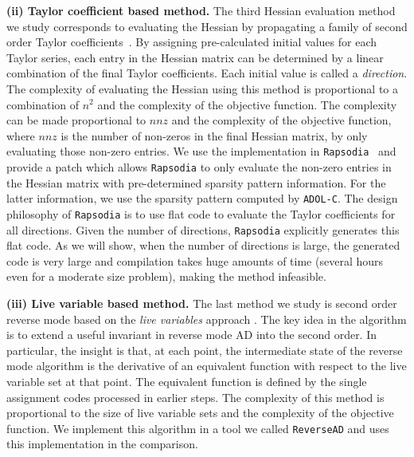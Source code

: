 \documentclass[final,leqno,onefignum,onetabnum]{siamart}
\begin{document}
{\bf (ii) Taylor coefficient based method. } 
The third Hessian evaluation method  we study  corresponds to evaluating the Hessian by propagating a family of second order Taylor coefficients~\cite{griewank2000evaluating}. 
By assigning pre-calculated initial values for each Taylor series, each entry in the Hessian matrix  can be determined by a linear combination of the final Taylor coefficients. Each initial value is called a {\em direction}.
The complexity of evaluating the Hessian using this method is proportional to a combination of $n^2$ and the complexity of the objective function. The complexity can be made proportional to $nnz$ and the complexity of the objective function, where $nnz$ is the number of non-zeros in the final Hessian matrix, by only evaluating those non-zero entries.
We use the implementation in {\tt Rapsodia}~\cite{charpentier2009fast} and provide a patch which allows {\tt Rapsodia} to only evaluate the non-zero entries in the Hessian matrix with pre-determined sparsity pattern information. For the latter information, we use the sparsity pattern computed by {\tt ADOL-C}. The design philosophy of {\tt Rapsodia} is to use flat code to evaluate the Taylor coefficients for all directions. Given the number of directions, {\tt Rapsodia} explicitly generates this flat code. As we will show, when the number of directions is large, the generated code is very large and compilation takes huge amounts of time (several hours even for a moderate size problem), making the method infeasible. 

{\bf (iii) Live variable based method. }
The last method we study is second order reverse mode based on the {\em live variables} approach \cite{wang2016capitalizing}. The key idea in the algorithm is to extend a useful invariant in reverse mode AD into the second order. In particular, the insight is that, at each point, the intermediate state of the reverse mode algorithm is the derivative of an equivalent function with respect to the live variable set at that point. The equivalent function is defined by the single assignment codes processed in earlier steps. The complexity of this method is proportional to the size of live variable sets and the complexity of the objective function. We implement this algorithm in a tool we called {\tt ReverseAD} and uses this implementation in the comparison.
\end{document}
